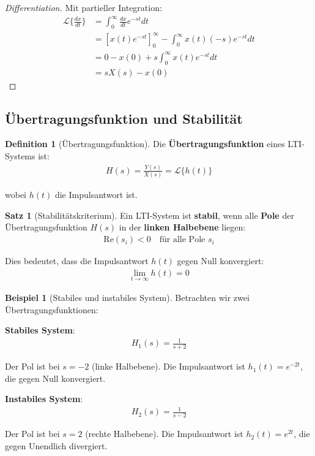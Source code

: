 ﻿\documentclass[a4paper,12pt]{report}
\theoremstyle{definition}
\newtheorem{definition}{Definition}
\newtheorem{beispiel}{Beispiel}
\newtheorem{satz}{Satz}
\begin{document}
	\begin{proof}[Differentiation]
		Mit partieller Integration:
		\begin{align}
			\mathcal{L}\{\frac{dx}{dt}\} &= \int_0^{\infty} \frac{dx}{dt} e^{-st} dt \\
			&= \left[x(t) e^{-st}\right]_0^{\infty} - \int_0^{\infty} x(t) (-s) e^{-st} dt \\
			&= 0 - x(0) + s \int_0^{\infty} x(t) e^{-st} dt \\
			&= s X(s) - x(0)
		\end{align}
	\end{proof}
	
	\subsection{Übertragungsfunktion und Stabilität}
	
	\begin{definition}[Übertragungsfunktion]
		Die \textbf{Übertragungsfunktion} eines LTI-Systems ist:
		\begin{align}
			H(s) = \frac{Y(s)}{X(s)} = \mathcal{L}\{h(t)\}
		\end{align}
		
		wobei $h(t)$ die Impulsantwort ist.
	\end{definition}
	
	\begin{satz}[Stabilitätskriterium]
		Ein LTI-System ist \textbf{stabil}, wenn alle \textbf{Pole} der Übertragungs\-funktion $H(s)$ in der \textbf{linken Halbebene} liegen:
		\begin{align}
			\text{Re}(s_i) < 0 \quad \text{für alle Pole } s_i
		\end{align}
		
		Dies bedeutet, dass die Impulsantwort $h(t)$ gegen Null konvergiert:
		\begin{align}
			\lim_{t \to \infty} h(t) = 0
		\end{align}
	\end{satz}
	
	\begin{beispiel}[Stabiles und instabiles System]
		Betrachten wir zwei Übertragungsfunktionen:
		
		\textbf{Stabiles System}:
		\begin{align}
			H_1(s) = \frac{1}{s + 2}
		\end{align}
		
		Der Pol ist bei $s = -2$ (linke Halbebene). Die Impulsantwort ist $h_1(t) = e^{-2t}$, die gegen Null konvergiert.
		
		\textbf{Instabiles System}:
		\begin{align}
			H_2(s) = \frac{1}{s - 2}
		\end{align}
		
		Der Pol ist bei $s = 2$ (rechte Halbebene). Die Impulsantwort ist $h_2(t) = e^{2t}$, die gegen Unendlich divergiert.
	\end{beispiel}
	
\end{document}
